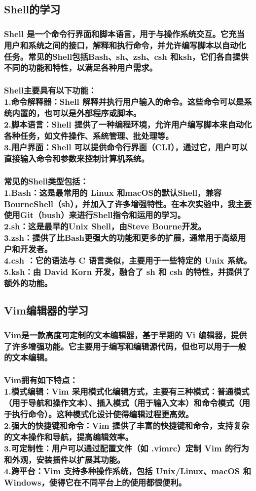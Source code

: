 \documentclass[UTF8,a4paper]{ctexart}
\begin{document}
\begin{sloppypar}
	\subsection{Shell的学习}
	\subsubsection{Shell 是一个命令行界面和脚本语言，用于与操作系统交互。它充当用户和系统之间的接口，解释和执行命令，并允许编写脚本以自动化任务。常见的Shell包括Bash、sh、zsh、csh 和ksh，它们各自提供不同的功能和特性，以满足各种用户需求。}
	\subsubsection{Shell主要具有以下功能：\\1.命令解释器：Shell 解释并执行用户输入的命令。这些命令可以是系统内置的，也可以是外部程序或脚本。\\2.脚本语言：Shell 提供了一种编程环境，允许用户编写脚本来自动化各种任务，如文件操作、系统管理、批处理等。\\3.用户界面：Shell 可以提供命令行界面（CLI），通过它，用户可以直接输入命令和参数来控制计算机系统。}
	\subsubsection{常见的Shell类型包括：\\1.Bash：这是最常用的 Linux 和macOS的默认Shell，兼容BourneShell（sh），并加入了许多增强特性。在本次实验中，我主要使用Git（bush）来进行Shell指令和运用的学习。\\2.sh：这是最早的Unix Shell，由Steve Bourne开发。\\3.zsh：提供了比Bash更强大的功能和更多的扩展，通常用于高级用户和开发者。\\4.csh ：它的语法与 C 语言类似，主要用于一些特定的 Unix 系统。\\5.ksh：由 David Korn 开发，融合了 sh 和 csh 的特性，并提供了额外的功能。}
	\subsection{Vim编辑器的学习}
	\subsubsection{Vim是一款高度可定制的文本编辑器，基于早期的 Vi 编辑器，提供了许多增强功能。它主要用于编写和编辑源代码，但也可以用于一般的文本编辑。}
	\subsubsection{Vim拥有如下特点：\\1.模式编辑：Vim 采用模式化编辑方式，主要有三种模式：普通模式（用于导航和操作文本）、插入模式（用于输入文本）和命令模式（用于执行命令）。这种模式化设计使得编辑过程更高效。\\2.强大的快捷键和命令：Vim 提供了丰富的快捷键和命令，支持复杂的文本操作和导航，提高编辑效率。\\3.可定制性：用户可以通过配置文件（如 .vimrc）定制 Vim 的行为和外观，安装插件以扩展其功能。\\4.跨平台：Vim 支持多种操作系统，包括 Unix/Linux、macOS 和 Windows，使得它在不同平台上的使用都很便利。}

\end{sloppypar}
\end{document}
